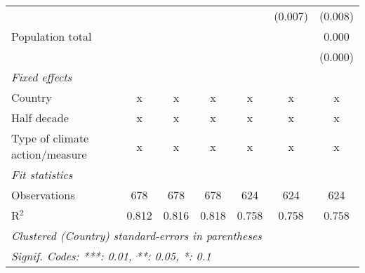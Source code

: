 \begin{tabular}{lcccccc}
                                                     &              &               &               &               & (0.007)       & (0.008)\\   
   Population total                                  &              &               &               &               &               & 0.000\\   
                                                     &              &               &               &               &               & (0.000)\\   
   \emph{Fixed effects}\\
   Country                                           & x            & x             & x             & x             & x             & x\\  
   Half decade                                       & x            & x             & x             & x             & x             & x\\  
   Type of climate action/measure                    & x            & x             & x             & x             & x             & x\\  
   \midrule \emph{Fit statistics}\\
   Observations                                      & 678          & 678           & 678           & 624           & 624           & 624\\  
   R$^2$                                             & 0.812        & 0.816         & 0.818         & 0.758         & 0.758         & 0.758\\  
   \midrule
   \multicolumn{7}{l}{\emph{Clustered (Country) standard-errors in parentheses}}\\
   \multicolumn{7}{l}{\emph{Signif. Codes: ***: 0.01, **: 0.05, *: 0.1}}\\
\end{tabular}
\par\endgroup


